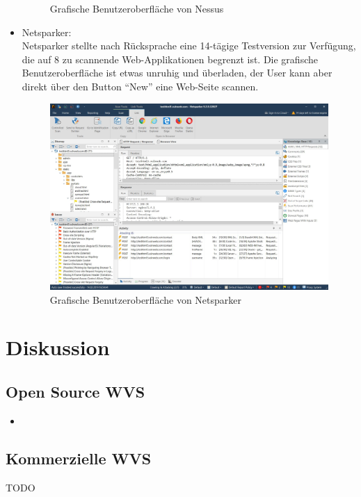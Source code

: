 \documentclass[12pt,oneside,a4paper,parskip]{scrbook}
\begin{document}
\begin{itemize}
\begin{figure}[H]
            \caption[Grafische Benutzeroberfläche von Nessus]{Grafische Benutzeroberfläche von Nessus}
          \end{figure}
        \item Netsparker:\\
          Netsparker stellte nach Rücksprache eine 14-tägige Testversion zur Verfügung, die auf 8 zu scannende Web-Applikationen begrenzt ist. Die grafische Benutzeroberfläche ist etwas unruhig und überladen, der User kann aber direkt über den Button ``New'' eine Web-Seite scannen.
          \begin{figure}[H]
            \includegraphics[width=1\textwidth]{Images/Netsparker}
            \caption[Grafische Benutzeroberfläche von Netsparker]{Grafische Benutzeroberfläche von Netsparker}
          \end{figure}
     \end{itemize}



\chapter{Diskussion}
  \section{Open Source WVS}
    \begin{itemize}
      \item

    \end{itemize}
  \section{Kommerzielle WVS}
  TODO
\end{document}
